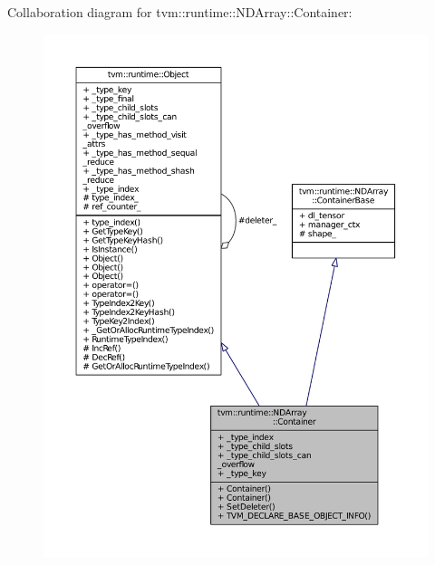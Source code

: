 Collaboration diagram for tvm\+:\+:runtime\+:\+:N\+D\+Array\+:\+:Container\+:
\nopagebreak
\begin{figure}[H]
\begin{center}
\leavevmode
\includegraphics[width=350pt]{classtvm_1_1runtime_1_1NDArray_1_1Container__coll__graph}
\end{center}
\end{figure}
